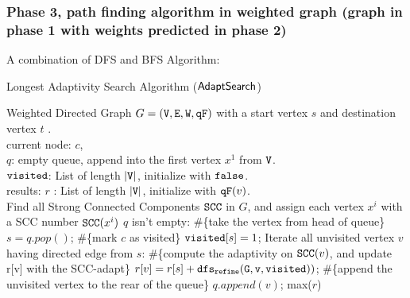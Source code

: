 \subsubsection{Phase 3, path finding algorithm in weighted graph (graph in phase 1 with weights predicted in phase 2) }
A combination of DFS and BFS Algorithm:
\begin{algorithm}
    \caption{
    {Longest Adaptivity Search Algorithm ($\mathsf{AdaptSearch}$)}
    \label{alg:adpt_alg}
    }
    \begin{algorithmic}
    \REQUIRE Weighted Directed Graph $G = (\mathtt{V}, \mathtt{E}, \mathtt{W}, \mathtt{qF})$ with a start vertex $s$ and destination vertex $t$ .
    \\
    current node: $c$, 
    \\
    $q$: empty queue, append into the first vertex $x^1$ from $\mathtt{V}$. 
    \\
    $\mathtt{visited}$: List of length $|\mathtt{V}|$, initialize with $\mathtt{false}$.
    \\
    results: $r$ : List of length $|\mathtt{V}|$, initialize with $\mathtt{qF}(v)$.
    \\
    \STATE Find all Strong Connected Components $\mathtt{SCC}$ in $G$, and assign each vertex $x^i$ with a SCC number $\mathtt{SCC}(x^i)$
     $q$ isn't empty:
    \STATE \qquad \#\{take the vertex from head of queue\} $s= q.pop()$;
    \STATE \qquad  \#\{mark $c$ as visited\} $\mathtt{visited}[s] = 1$;
    \STATE \qquad Iterate all unvisited vertex $v$ having directed edge from $s$:
    \STATE \qquad \qquad \#\{compute the adaptivity on $\mathtt{SCC}(v)$, and update r[v] with the SCC-adapt\}
    \STATE \qquad \qquad $ r[v] = r[s] + \mathtt{dfs_{refine}(G, v, visited)})$; 
    \STATE \qquad \qquad \#\{append the unvisited vertex to the rear of the queue\}
    \STATE \qquad \qquad $q.append(v)$;
    \RETURN max($r$)
    \end{algorithmic}
    \end{algorithm}
